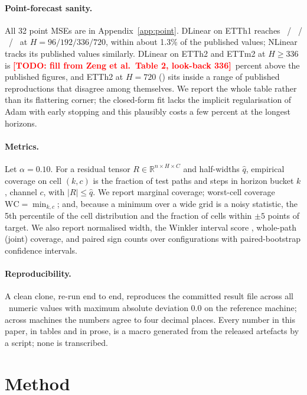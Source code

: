 \documentclass[11pt]{article}
\newcommand{\wc}{\mathrm{WC}}
\newcommand{\todo}[1]{\textcolor{red}{\textbf{[TODO: #1]}}}
\begin{document}
\paragraph{Point-forecast sanity.} All 32 point MSEs are in Appendix~\ref{app:point}. DLinear on ETTh1 reaches \mseDLinearETThOneNinetySix\ / \mseDLinearETThOneOneNinetyTwo\ / \mseDLinearETThOneThreeThirtySix\ / \mseDLinearETThOneSevenTwenty\ at $H = 96/192/336/720$, within about 1.3\% of the published values; NLinear tracks its published values similarly. DLinear on ETTh2 and ETTm2 at $H \ge 336$ is \todo{fill from Zeng et al.\ Table 2, look-back 336}\ percent above the published figures, and ETTh2 at $H = 720$ (\mseDLinearETThTwoSevenTwenty) sits inside a range of published reproductions that disagree among themselves. We report the whole table rather than its flattering corner; the closed-form fit lacks the implicit regularisation of Adam with early stopping and this plausibly costs a few percent at the longest horizons.

\paragraph{Metrics.} Let $\alpha = 0.10$. For a residual tensor $R \in \mathbb{R}^{n \times H \times C}$ and half-widths $\hat q$, empirical coverage on cell $(k,c)$ is the fraction of test paths and steps in horizon bucket $k$, channel $c$, with $|R| \le \hat q$. We report marginal coverage; worst-cell coverage $\wc = \min_{k,c}$; and, because a minimum over a wide grid is a noisy statistic, the 5th percentile of the cell distribution and the fraction of cells within $\pm 5$ points of target. We also report normalised width, the Winkler interval score \citep{winkler1972}, whole-path (joint) coverage, and paired sign counts over configurations with paired-bootstrap confidence intervals.

\paragraph{Reproducibility.} A clean clone, re-run end to end, reproduces the committed result file across all \ettTotalValues\ numeric values with maximum absolute deviation 0.0 on the reference machine; across machines the numbers agree to four decimal places. Every number in this paper, in tables and in prose, is a macro generated from the released artefacts by a script; none is transcribed.

\section{Method}\label{sec:method}
\end{document}
